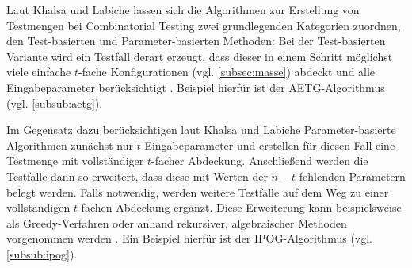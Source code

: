 Laut Khalsa und Labiche \cite{khalsa2014orchestrated} lassen sich die Algorithmen zur Erstellung von Testmengen bei Combinatorial Testing zwei grundlegenden Kategorien zuordnen, den Test-basierten und Parameter-basierten Methoden: Bei der Test-basierten Variante wird ein Testfall derart erzeugt, dass dieser in einem Schritt möglichst viele einfache $t$-fache Konfigurationen (vgl. \autoref{subsec:masse}) abdeckt und alle Eingabeparameter berücksichtigt \cite{khalsa2014orchestrated}. Beispiel hierfür ist der AETG-Algorithmus (vgl. \autoref{subsub:aetg}). 

Im Gegensatz dazu berücksichtigen laut Khalsa und Labiche \cite{khalsa2014orchestrated} Parameter-basierte Algorithmen zunächst nur $t$ Eingabeparameter und erstellen für diesen Fall eine Testmenge mit vollständiger $t$-facher Abdeckung. Anschließend werden die Testfälle dann so erweitert, dass diese mit Werten der $n-t$ fehlenden Parametern belegt werden. Falls notwendig, werden weitere Testfälle auf dem Weg zu einer vollständigen $t$-fachen Abdeckung ergänzt. Diese Erweiterung kann beispielsweise als Greedy-Verfahren oder anhand rekursiver, algebraischer Methoden vorgenommen werden \cite{khalsa2014orchestrated}. Ein Beispiel hierfür ist der IPOG-Algorithmus (vgl. \autoref{subsub:ipog}).

